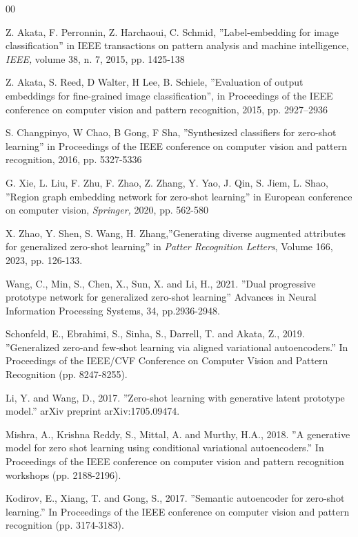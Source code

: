 \documentclass{article}
\begin{document}
\newpage
\begin{thebibliography}{00}

 Z. Akata, F. Perronnin, Z. Harchaoui, C. Schmid, ''Label-embedding for image classification'' in IEEE transactions on pattern analysis and machine intelligence, \emph{IEEE,} volume 38, n. 7, 2015, pp. 1425-138

 Z. Akata, S. Reed, D Walter, H Lee, B. Schiele, ''Evaluation of output embeddings for fine-grained image classification'', in Proceedings of the IEEE conference on computer vision and pattern recognition, 2015, pp. 2927--2936

 S. Changpinyo, W Chao, B Gong, F Sha,  ''Synthesized classifiers for zero-shot learning'' in Proceedings of the IEEE conference on computer vision and pattern recognition, 2016, pp. 5327-5336

 G. Xie,  L. Liu, F. Zhu, F. Zhao, Z. Zhang, Y. Yao, J. Qin, S. Jiem, L. Shao, ''Region graph embedding network for zero-shot learning'' in European conference on computer vision, \emph{Springer,} 2020, pp. 562-580

 X. Zhao, Y. Shen, S. Wang, H. Zhang,''Generating diverse augmented attributes for generalized zero-shot learning'' in \emph{Patter Recognition Letters}, Volume 166, 2023, pp. 126-133.

 Wang, C., Min, S., Chen, X., Sun, X. and Li, H., 2021. ''Dual progressive prototype network for generalized zero-shot learning'' Advances in Neural Information Processing Systems, 34, pp.2936-2948.

 Schonfeld, E., Ebrahimi, S., Sinha, S., Darrell, T. and Akata, Z., 2019. ''Generalized zero-and few-shot learning via aligned variational autoencoders.'' In Proceedings of the IEEE/CVF Conference on Computer Vision and Pattern Recognition (pp. 8247-8255).

 Li, Y. and Wang, D., 2017. ''Zero-shot learning with generative latent prototype model.'' arXiv preprint arXiv:1705.09474.

 Mishra, A., Krishna Reddy, S., Mittal, A. and Murthy, H.A., 2018. ''A generative model for zero shot learning using conditional variational autoencoders.'' In Proceedings of the IEEE conference on computer vision and pattern recognition workshops (pp. 2188-2196).

 Kodirov, E., Xiang, T. and Gong, S., 2017. ''Semantic autoencoder for zero-shot learning.'' In Proceedings of the IEEE conference on computer vision and pattern recognition (pp. 3174-3183).


\end{thebibliography}
\end{document}
